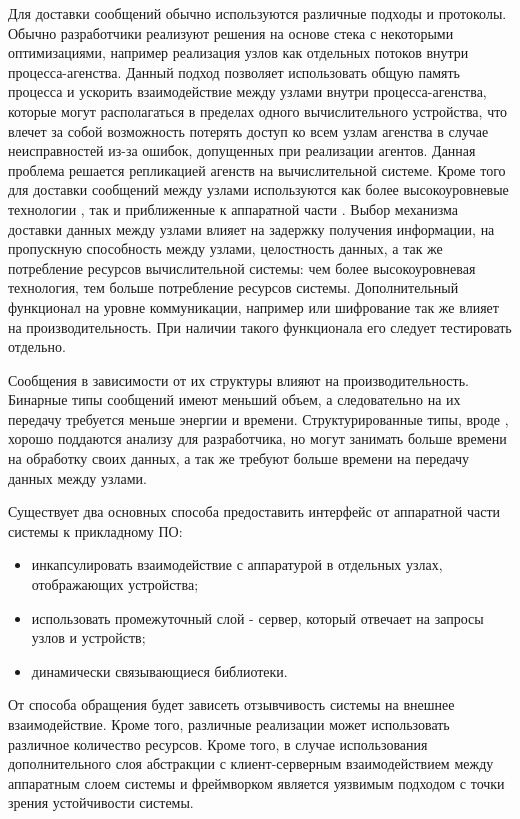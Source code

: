\begin{description}[noitemsep]
	\item [Протоколы коммуникации.] Для доставки сообщений обычно используются различные подходы и протоколы. Обычно разработчики реализуют решения на основе стека  с некоторыми оптимизациями, например реализация узлов как отдельных потоков внутри процесса-агенства. Данный подход позволяет использовать общую память процесса и ускорить взаимодействие между узлами внутри процесса-агенства, которые могут располагаться в пределах одного вычислительного устройства, что влечет за собой возможность потерять доступ ко всем узлам агенства в случае неисправностей из-за ошибок, допущенных при реализации агентов. Данная проблема решается репликацией агенств на вычислительной системе. Кроме того для доставки сообщений между узлами используются как более высокоуровневые технологии , так и приближенные к аппаратной части . Выбор механизма доставки данных между узлами влияет на задержку получения информации, на пропускную способность между узлами, целостность данных, а так же потребление ресурсов вычислительной системы: чем более высокоуровневая технология, тем больше потребление ресурсов системы. Дополнительный функционал на уровне коммуникации, например  или шифрование так же влияет на производительность. При наличии такого функционала его следует тестировать отдельно.

	\item [Формат сообщений.] Сообщения в зависимости от их структуры влияют на производительность. Бинарные типы сообщений имеют меньший объем, а следовательно на их передачу требуется меньше энергии и времени. Структурированные типы, вроде , хорошо поддаются анализу для разработчика, но могут занимать больше времени на обработку своих данных, а так же требуют больше времени на передачу данных между узлами.

	\item [Способ взаимодействия с аппаратурой.] Существует два основных способа предоставить интерфейс от аппаратной части системы к прикладному ПО:
	\begin{itemize}[noitemsep]
		\item инкапсулировать взаимодействие с аппаратурой в отдельных узлах, отображающих устройства;
		\item использовать промежуточный слой - сервер, который отвечает на запросы узлов и устройств;
		\item динамически связывающиеся библиотеки.
	\end{itemize}
	
	От способа обращения будет зависеть отзывчивость системы на внешнее взаимодействие. Кроме того, различные реализации может использовать различное количество ресурсов. Кроме того, в случае использования дополнительного слоя абстракции с клиент-серверным взаимодействием между аппаратным слоем системы и фреймворком является уязвимым подходом с точки зрения устойчивости системы.

\end{description}

